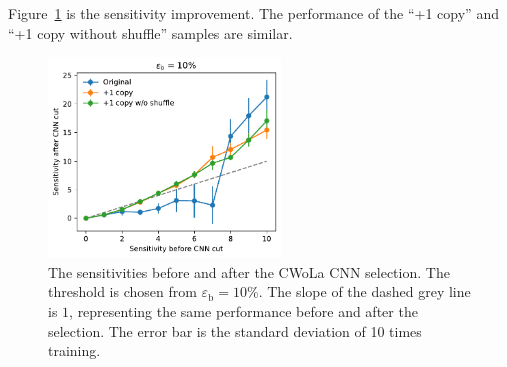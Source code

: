\documentclass[12pt]{article}
\begin{document}
        Figure~\ref{fig:sensitivity_improvement_bkg_eff_01_copy_1_wo_shuffle} is the sensitivity improvement. The performance of the ``+1 copy'' and ``+1 copy without shuffle'' samples are similar.
        \begin{figure}[htpb]
            \centering
            \includegraphics[width=0.55\textwidth]{HVmodel_sensitivity_improvement_bkg_eff_10_copy_1_wo_shuffle.pdf}
            \caption{The sensitivities before and after the CWoLa CNN selection. The threshold is chosen from $\varepsilon_{\text{b}} = 10\%$. The slope of the dashed grey line is $1$, representing the same performance before and after the selection. The error bar is the standard deviation of 10 times training.}
            \label{fig:sensitivity_improvement_bkg_eff_01_copy_1_wo_shuffle}
        \end{figure}
\end{document}
